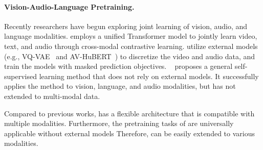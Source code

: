 \paragraph{Vision-Audio-Language Pretraining.}
Recently researchers have begun exploring joint learning of vision, audio, and language modalities. 
\cite{vatt} employs a unified Transformer model to jointly learn video, text, and audio through cross-modal contrastive learning. 
\cite{icode,vatlm} utilize external models (e.g., VQ-VAE~\cite{vqvae} and AV-HuBERT~\cite{av_hubert}) to discretize the video and audio data, and train the models with masked prediction objectives.
~\cite{data2vec} proposes a general self-supervised learning method that does not rely on external models.
It successfully applies the method to vision, language, and audio modalities, but has not extended to multi-modal data.


Compared to previous works, \onepeace has a flexible architecture that is compatible with multiple modalities. Furthermore, the pretraining tasks of \onepeace are universally applicable without external models
Therefore, \onepeace can be easily extended to various modalities.
